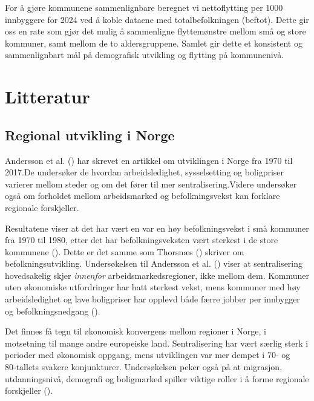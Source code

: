 \documentclass[
  norsk,
  letterpaper,
  DIV=11,
  numbers=noendperiod]{scrartcl}
\begin{document}
For å gjøre kommunene sammenlignbare beregnet vi nettoflytting per 1000
innbyggere for 2024 ved å koble dataene med totalbefolkningen (beftot).
Dette gir oss en rate som gjør det mulig å sammenligne flyttemønstre
mellom små og store kommuner, samt mellom de to aldersgruppene. Samlet
gir dette et konsistent og sammenlignbart mål på demografisk utvikling
og flytting på kommunenivå.

\section{Litteratur}\label{litteratur}

\subsection{Regional utvikling i
Norge}\label{regional-utvikling-i-norge}

Andersson et al. () har skrevet en
artikkel om utviklingen i Norge fra 1970 til 2017.De undersøker de
hvordan arbeidsledighet, sysselsetting og boligpriser varierer mellom
steder og om det fører til mer sentralisering.Videre undersøker også om
forholdet mellom arbeidsmarked og befolkningsvekst kan forklare
regionale forskjeller.

Resultatene viser at det har vært en var en høy befolkningsvekst i små
kommuner fra 1970 til 1980, etter det har befolkningsveksten vært
sterkest i de store kommunene (). Dette er det samme som Thorsnæs
() skriver om befolkningsutvikling.
Undersøkelsen til Andersson et al. ()
viser at sentralisering hovedsakelig skjer \emph{innenfor}
arbeidsmarkedsregioner, ikke mellom dem. Kommuner uten økonomiske
utfordringer har hatt sterkest vekst, mens kommuner med høy
arbeidsledighet og lave boligpriser har opplevd både færre jobber per
innbygger og befolkningsnedgang ().

Det finnes få tegn til økonomisk konvergens mellom regioner i Norge, i
motsetning til mange andre europeiske land. Sentralisering har vært
særlig sterk i perioder med økonomisk oppgang, mens utviklingen var mer
dempet i 70‑ og 80‑tallets svakere konjunkturer. Undersøkelsen peker
også på at migrasjon, utdanningsnivå, demografi og boligmarked spiller
viktige roller i å forme regionale forskjeller
().
\end{document}
